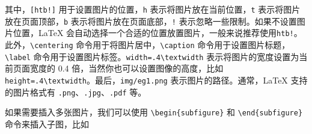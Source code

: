 其中，\texttt{[htb!]} 用于设置图片的位置，\texttt{h} 表示将图片放在当前位置，\texttt{t} 表示将图片放在页面顶部，\texttt{b} 表示将图片放在页面底部，\texttt{!} 表示忽略一些限制。如果不设置图片位置，LaTeX 会自动选择一个合适的位置放置图片，一般来说推荐使用\texttt{htb!}。此外，\texttt{\textbackslash centering} 命令用于将图片居中，\texttt{\textbackslash caption} 命令用于设置图片标题，\texttt{\textbackslash label} 命令用于设置图片标签。\texttt{width=.4\textbackslash textwidth} 表示将图片的宽度设置为当前页面宽度的 0.4 倍，当然你也可以设置图像的高度，比如 \texttt{height=.4\textbackslash textwidth}。最后，\texttt{img/eg1.png} 表示图片的路径。通常，LaTeX 支持的图片格式有 \texttt{.png}、\texttt{.jpg}、\texttt{.pdf} 等。

如果需要插入多张图片，我们可以使用 \texttt{\textbackslash begin\{subfigure\}} 和 \texttt{\textbackslash end\{subfigure\}} 命令来插入子图，比如

